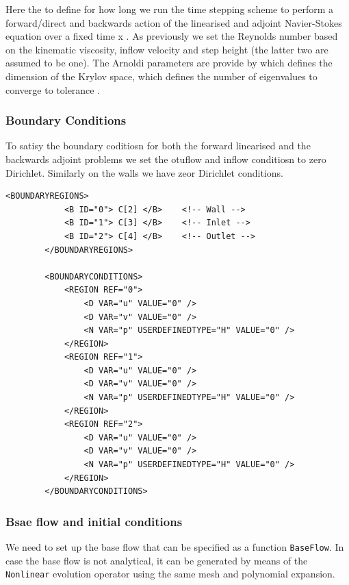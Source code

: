     Here the  to define for how long we run the time
    stepping scheme to perform a forward/direct and backwards action
    of the linearised and adjoint Navier-Stokes equation over a fixed time
     x . As previously we set the
    Reynolds number based on the kinematic viscosity, inflow velocity
    and step height (the latter two are assumed to be one). The
    Arnoldi parameters are provide by  which defines the
    dimension of the Krylov space,  which defines the
    number of eigenvalues to converge to tolerance . 

    \subsubsection*{Boundary Conditions}

    To satisy the boundary coditiosn for both the forward linearised and the backwards adjoint problems we set the otuflow and inflow conditiosn to zero Dirichlet. Similarly on the walls we have zeor Dirichlet conditions. 
      \begin{lstlisting}[style=XMLStyle]
 <BOUNDARYREGIONS>
            <B ID="0"> C[2] </B>    <!-- Wall -->
            <B ID="1"> C[3] </B>    <!-- Inlet -->
            <B ID="2"> C[4] </B>    <!-- Outlet -->
        </BOUNDARYREGIONS>

        <BOUNDARYCONDITIONS>
            <REGION REF="0">
                <D VAR="u" VALUE="0" />
                <D VAR="v" VALUE="0" />
                <N VAR="p" USERDEFINEDTYPE="H" VALUE="0" />
            </REGION>
            <REGION REF="1">
                <D VAR="u" VALUE="0" />
                <D VAR="v" VALUE="0" />
                <N VAR="p" USERDEFINEDTYPE="H" VALUE="0" />
            </REGION>
            <REGION REF="2">
                <D VAR="u" VALUE="0" />
                <D VAR="v" VALUE="0" />
                <N VAR="p" USERDEFINEDTYPE="H" VALUE="0" />
            </REGION>
        </BOUNDARYCONDITIONS>
           \end{lstlisting}

\subsubsection*{Bsae flow and initial conditions}

We need to set up the base flow that can be specified as a function
\texttt{BaseFlow}. In case the base flow is not analytical, it can be
generated by means of the \texttt{Nonlinear} evolution operator using
the same mesh and polynomial expansion.

